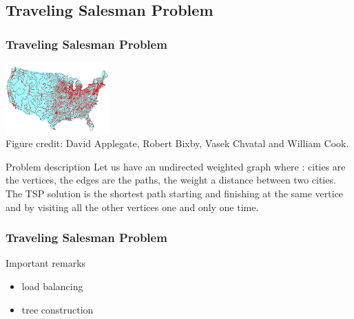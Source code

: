 \subsection{Traveling Salesman Problem}
\begin{frame}[containsverbatim]
\frametitle{Traveling Salesman Problem}
\begin{center}
\includegraphics[width=4.0cm]{Day2/images/tsp.png}
\\
{\tiny Figure credit: David Applegate, Robert Bixby, Vasek Chvatal and William Cook.}
\end{center}
\begin{block}{Problem description}
Let us have an undirected weighted graph where : cities are the vertices, the edges are the paths, the weight a distance between two cities. The TSP solution is the shortest path starting and finishing at the same vertice and by visiting all the other vertices one and only one time.
\end{block}
\end{frame}
\begin{frame}[containsverbatim]
\frametitle{Traveling Salesman Problem}
\begin{block}{Important remarks}
\begin{itemize}
	\item{load balancing}
	\item{tree construction}
\end{itemize}
\end{block}
\end{frame}




